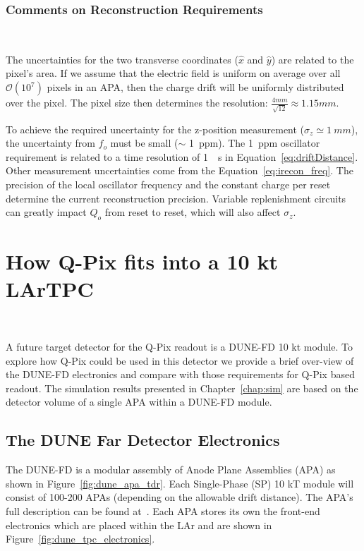 \subsubsection{Comments on Reconstruction Requirements}~\label{sec:recon_uncert}

The uncertainties for the two transverse coordinates ($\hat{x}$ and $\hat{y}$) are related to the pixel's area.
If we assume that the electric field is uniform on average over all $\mathcal{O}(10^{7})$ pixels in an APA, then the charge drift will be uniformly distributed over the pixel.
The pixel size then determines the resolution: $\frac{4 mm}{\sqrt{12}} \approx 1.15 mm$.

To achieve the required uncertainty for the z-position measurement ($\sigma_{z} \simeq 1~\unit{mm}$), the uncertainty from $f_{o}$ must be small ($\sim$ 1~\unit{ppm}).
The 1~\unit{ppm} oscillator requirement is related to a time resolution of 1~\unit{\mu s} in Equation~\ref{eq:driftDistance}.
Other measurement uncertainties come from the Equation~\ref{eq:irecon_freq}.
The precision of the local oscillator frequency and the constant charge per reset determine the current reconstruction precision.
Variable replenishment circuits can greatly impact $Q_{o}$ from reset to reset, which will also affect $\sigma_{z}$.

\section{How Q-Pix fits into a 10 kt LArTPC}~\label{sec:qpix_apa}

A future target detector for the Q-Pix readout is a DUNE-FD 10 kt module.
To explore how Q-Pix could be used in this detector we provide a brief over-view of the DUNE-FD electronics and compare with those requirements for Q-Pix based readout.
The simulation results presented in Chapter~\ref{chap:sim} are based on the detector volume of a single APA within a DUNE-FD module.

\subsection{The DUNE Far Detector Electronics}

The DUNE-FD is a modular assembly of Anode Plane Assemblies (APA) as shown in Figure~\ref{fig:dune_apa_tdr}.
Each Single-Phase (SP) 10 kT module will consist of 100-200 APAs (depending on the allowable drift distance).
The APA's full description can be found at~\citep{DUNE-FD_TDRv4:Abi_2020}.
Each APA stores its own the front-end electronics which are placed within the LAr and are shown in Figure~\ref{fig:dune_tpc_electronics}.

